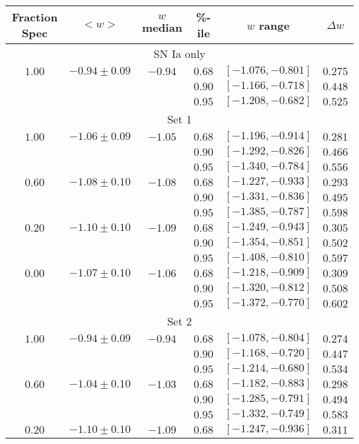 \documentclass[preprint,3p]{elsarticle}
\begin{document}
\begin{table}
\centering
\begin{tabular}{|c|cc|ccc|}
\hline
Fraction Spec&$<w>$ & $w$ median &\%-ile  &$w$ range & $\Delta w$\\ \hline
\multicolumn{6}{|c|}{SN Ia only}\\ \hline
$1.00$& $-0.94 \pm 0.09$ &$-0.94$ &$0.68$ & $[-1.076, -0.801]$ & $0.275$ \\
&  &  & $0.90$ & $[-1.166, -0.718]$ & $0.448$ \\
&  &  & $0.95$ & $[-1.208, -0.682]$ & $0.525$ \\
 \hline
\multicolumn{6}{|c|}{Set 1}\\ \hline
$1.00$ &$-1.06 \pm  0.09$ &$-1.05$ &$0.68$ & $[-1.196, -0.914]$ & $0.281$ \\
&&&$0.90$ & $[-1.292, -0.826]$ & $0.466$ \\
&&&$0.95$ & $[-1.340, -0.784]$ & $0.556$ \\
\hline
$0.60$ &$-1.08 \pm  0.10$ & $-1.08$ &$0.68$ & $[-1.227, -0.933]$ & $0.293$ \\
& & &$0.90$ & $[-1.331, -0.836]$ & $0.495$ \\
& & &$0.95$ & $[-1.385, -0.787]$ & $0.598$ \\
\hline
$0.20$ &$-1.10 \pm  0.10$ & $-1.09$ &$0.68$ & $[-1.249, -0.943]$ & $0.305$ \\
& & &$0.90$ & $[-1.354, -0.851]$ & $0.502$ \\
& & &$0.95$ & $[-1.408, -0.810]$ & $0.597$ \\
\hline
$0.00$ &$-1.07 \pm  0.10$ & $-1.06$ &$0.68$ & $[-1.218, -0.909]$ & $0.309$ \\
& & &$0.90$ & $[-1.320, -0.812]$ & $0.508$ \\
& & &$0.95$ & $[-1.372, -0.770]$ & $0.602$ \\
\hline
\multicolumn{6}{|c|}{Set 2}\\ \hline
$1.00$ &$-0.94 \pm  0.09$ &$-0.94$ &$0.68$ & $[-1.078, -0.804]$ & $0.274$ \\
&&&$0.90$ & $[-1.168, -0.720]$ & $0.447$ \\
&&&$0.95$ & $[-1.214, -0.680]$ & $0.534$ \\
\hline
$0.60$ &$-1.04 \pm  0.10$ & $-1.03$ &$0.68$ & $[-1.182, -0.883]$ & $0.298$ \\
& & &$0.90$ & $[-1.285, -0.791]$ & $0.494$ \\
& & &$0.95$ & $[-1.332, -0.749]$ & $0.583$ \\
\hline
$0.20$ &$-1.10 \pm  0.10$ & $-1.09$ &$0.68$ & $[-1.247, -0.936]$ & $0.311$ \\

\end{tabular}
\end{table}
\end{document}
